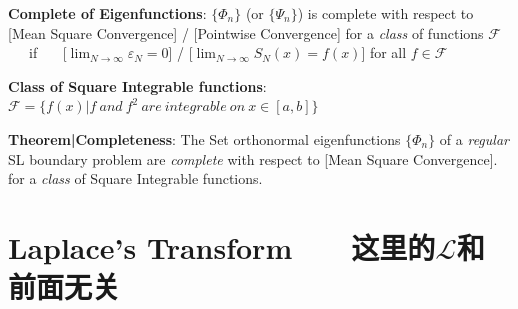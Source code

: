 \documentclass[8pt]{extarticle}
\begin{document}
\textbf{Complete of Eigenfunctions}: $\{\Phi_n\}$ (or $\{\Psi_n\}$) is complete with respect to [Mean Square Convergence] / [Pointwise Convergence] for a \textit{class} of functions $\mathcal{F}$ \ \ \ if \ \ \ [$\lim_{N\to\infty}\varepsilon_N=0$] / [$\lim_{N\to\infty}S_N(x)=f(x)$] for all $f\in\mathcal{F}$

\textbf{Class of Square Integrable functions}: $\mathcal{F}=\{f(x)|f \ and \ f^2 \ are \ integrable \ on \ x\in[a,b]\}$

\textbf{Theorem|Completeness}: The Set orthonormal eigenfunctions $\{\Phi_n\}$ of a \textit{regular} SL boundary problem are \textit{complete} with respect to [Mean Square Convergence]. for a \textit{class} of Square Integrable functions.


\section{Laplace's Transform \ \ \ {\tiny 这里的$\mathcal{L}$和前面无关}}
\end{document}
